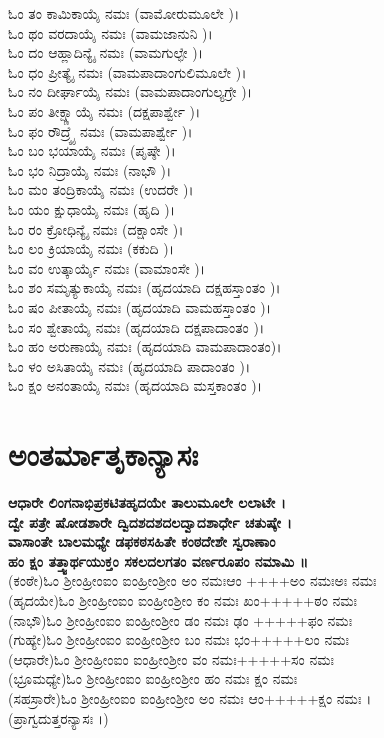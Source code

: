 ಓಂ ತಂ ಕಾಮಿಕಾಯೈ ನಮಃ (ವಾಮೋರುಮೂಲೇ )।\\
ಓಂ ಥಂ ವರದಾಯೈ ನಮಃ (ವಾಮಜಾನುನಿ )।\\
ಓಂ ದಂ ಆಹ್ಲಾದಿನ್ಯೈ ನಮಃ (ವಾಮಗುಲ್ಫೇ )।\\
ಓಂ ಧಂ ಪ್ರೀತ್ಯೈ ನಮಃ (ವಾಮಪಾದಾಂಗುಲಿಮೂಲೇ )।\\
ಓಂ ನಂ ದೀರ್ಘಾಯೈ ನಮಃ (ವಾಮಪಾದಾಂಗುಲ್ಯಗ್ರೇ )।\\
ಓಂ ಪಂ ತೀಕ್ಷ್ಣಾಯೈ ನಮಃ (ದಕ್ಷಪಾರ್ಶ್ವೇ )।\\
ಓಂ ಫಂ ರೌದ್ರ್ಯೈ ನಮಃ (ವಾಮಪಾರ್ಶ್ವೇ )।\\
ಓಂ ಬಂ ಭಯಾಯೈ ನಮಃ (ಪೃಷ್ಠೇ )।\\
ಓಂ ಭಂ ನಿದ್ರಾಯೈ ನಮಃ (ನಾಭೌ )।\\
ಓಂ ಮಂ ತಂದ್ರಿಕಾಯೈ ನಮಃ (ಉದರೇ )।\\
ಓಂ ಯಂ ಕ್ಷುಧಾಯೈ ನಮಃ (ಹೃದಿ )।\\
ಓಂ ರಂ ಕ್ರೋಧಿನ್ಯೈ ನಮಃ (ದಕ್ಷಾಂಸೇ )।\\
ಓಂ ಲಂ ಕ್ರಿಯಾಯೈ ನಮಃ (ಕಕುದಿ )।\\
ಓಂ ವಂ ಉತ್ಕಾರ್ಯೈ ನಮಃ (ವಾಮಾಂಸೇ )।\\
ಓಂ ಶಂ ಸಮೃತ್ಯುಕಾಯೈ ನಮಃ (ಹೃದಯಾದಿ ದಕ್ಷಹಸ್ತಾಂತಂ )।\\
ಓಂ ಷಂ ಪೀತಾಯೈ ನಮಃ (ಹೃದಯಾದಿ ವಾಮಹಸ್ತಾಂತಂ )।\\
ಓಂ ಸಂ ಶ್ವೇತಾಯೈ ನಮಃ (ಹೃದಯಾದಿ ದಕ್ಷಪಾದಾಂತಂ )।\\
ಓಂ ಹಂ ಅರುಣಾಯೈ ನಮಃ (ಹೃದಯಾದಿ ವಾಮಪಾದಾಂತಂ)।\\
ಓಂ ಳಂ ಅಸಿತಾಯೈ ನಮಃ (ಹೃದಯಾದಿ ಪಾದಾಂತಂ )।\\
ಓಂ ಕ್ಷಂ ಅನಂತಾಯೈ ನಮಃ (ಹೃದಯಾದಿ ಮಸ್ತಕಾಂತಂ )।
\section{ಅಂತರ್ಮಾತೃಕಾನ್ಯಾಸಃ }
{\bfseries ಆಧಾರೇ ಲಿಂಗನಾಭಿಪ್ರಕಟಿತಹೃದಯೇ ತಾಲುಮೂಲೇ ಲಲಾಟೇ ।\\
ದ್ವೇ ಪತ್ರೇ ಷೋಡಶಾರೇ ದ್ವಿದಶದಶದಲದ್ವಾದಶಾರ್ಧೇ ಚತುಷ್ಕೇ ।\\
ವಾಸಾಂತೇ ಬಾಲಮಧ್ಯೇ ಡಫಕಠಸಹಿತೇ ಕಂಠದೇಶೇ ಸ್ವರಾಣಾಂ\\
ಹಂ ಕ್ಷಂ ತತ್ತ್ವಾರ್ಥಯುಕ್ತಂ ಸಕಲದಲಗತಂ ವರ್ಣರೂಪಂ ನಮಾಮಿ ॥}\\
(ಕಂಠೇ)ಓಂ ಶ್ರೀಂಹ್ರೀಂಐಂ ಐಂಹ್ರೀಂಶ್ರೀಂ ಅಂ ನಮಃಆಂ ++++ಅಂ ನಮಃಅಃ ನಮಃ\\
(ಹೃದಯೇ)ಓಂ ಶ್ರೀಂಹ್ರೀಂಐಂ ಐಂಹ್ರೀಂಶ್ರೀಂ ಕಂ ನಮಃ ಖಂ+++++ಠಂ ನಮಃ\\
(ನಾಭೌ)ಓಂ ಶ್ರೀಂಹ್ರೀಂಐಂ ಐಂಹ್ರೀಂಶ್ರೀಂ ಡಂ ನಮಃ ಢಂ +++++ಫಂ ನಮಃ\\
(ಗುಹ್ಯೇ)ಓಂ ಶ್ರೀಂಹ್ರೀಂಐಂ ಐಂಹ್ರೀಂಶ್ರೀಂ ಬಂ ನಮಃ ಭಂ+++++ಲಂ ನಮಃ\\
(ಆಧಾರೇ)ಓಂ ಶ್ರೀಂಹ್ರೀಂಐಂ ಐಂಹ್ರೀಂಶ್ರೀಂ ವಂ ನಮಃ+++++ಸಂ ನಮಃ\\
(ಭ್ರೂಮಧ್ಯೇ)ಓಂ ಶ್ರೀಂಹ್ರೀಂಐಂ ಐಂಹ್ರೀಂಶ್ರೀಂ ಹಂ ನಮಃ ಕ್ಷಂ ನಮಃ\\
(ಸಹಸ್ರಾರೇ)ಓಂ ಶ್ರೀಂಹ್ರೀಂಐಂ ಐಂಹ್ರೀಂಶ್ರೀಂ ಅಂ ನಮಃ ಆಂ+++++ಕ್ಷಂ ನಮಃ ।\\
(ಪ್ರಾಗ್ವದುತ್ತರನ್ಯಾಸಃ ।)
